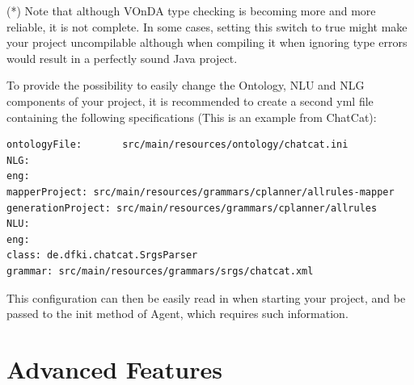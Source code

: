 \documentclass[a4paper]{report}
\newcommand{\vonda}{VOnDA\xspace}
\begin{document}
(*) Note that although \vonda type checking is becoming more and more reliable, it is not complete. In some cases, setting this switch to true might make your project uncompilable although when compiling it when ignoring type errors would result in a perfectly sound Java project.

To provide the possibility to easily change the Ontology, NLU and NLG components of your project, it is recommended to create a second yml file containing the following specifications (This is an example from ChatCat):

\begin{verbatim}
ontologyFile:       src/main/resources/ontology/chatcat.ini
NLG:
eng:
mapperProject: src/main/resources/grammars/cplanner/allrules-mapper
generationProject: src/main/resources/grammars/cplanner/allrules
NLU:
eng:
class: de.dfki.chatcat.SrgsParser
grammar: src/main/resources/grammars/srgs/chatcat.xml
\end{verbatim}

This configuration can then be easily read in when starting your project, and be passed to the init method of Agent, which requires such information.

%
%
%
%

\section{Advanced Features}
\end{document}

